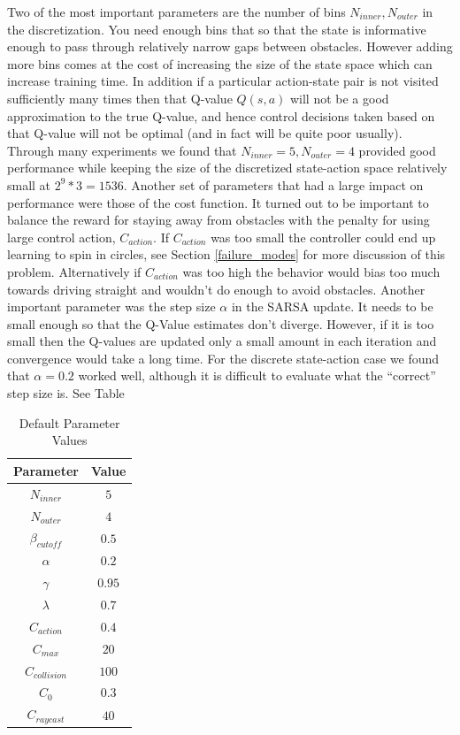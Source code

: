 \documentclass{article}
\begin{document}
Two of the most important parameters are the number of bins $N_{inner}, N_{outer}$ in the discretization. You need enough bins that so that the state is informative enough to pass through relatively narrow gaps between obstacles. However adding more bins comes at the cost of increasing the size of the state space which can increase training time. In addition if a particular action-state pair is not visited sufficiently many times then that Q-value $Q(s,a)$ will not be a good approximation to the true Q-value, and hence control decisions taken based on that Q-value will not be optimal (and in fact will be quite poor usually). Through many experiments we found that $N_{inner} = 5, N_{outer} = 4$ provided good performance while keeping the size of the discretized state-action space relatively small at $2^9 * 3 = 1536$. Another set of parameters that had a large impact on performance were those of the cost function. It turned out to be important to balance the reward for staying away from obstacles with the penalty for using large control action, $C_{action}$. If $C_{action}$ was too small the controller could end up learning to spin in circles, see Section \ref{failure_modes} for more discussion of this problem. Alternatively if $C_{action}$ was too high the behavior would bias too much towards driving straight and wouldn't do enough to avoid obstacles. Another important parameter was the step size $\alpha$ in the SARSA update. It needs to be small enough so that the Q-Value estimates don't diverge. However, if it is too small then the Q-values are updated only a small amount in each iteration and convergence would take a long time. For the discrete state-action case we found that $\alpha = 0.2$ worked well, although it is difficult to evaluate what the ``correct'' step size is. See Table

\begin{table}
\centering
\begin{tabular}{|c|c|}
\hline
Parameter & Value  \\ \hline
$N_{inner}$ & $5$ \\ \hline
$N_{outer}$ & $4$ \\ \hline
$\beta_{cutoff}$ & $0.5$ \\ \hline
$\alpha$ & $0.2$ \\ \hline
$\gamma$ & $0.95$ \\ \hline
$\lambda$ & $0.7$ \\ \hline
$C_{action}$ & $0.4$ \\ \hline
$C_{max}$ & $20$ \\ \hline
$C_{collision}$ & $100$ \\ \hline
$C_0$ & $0.3$ \\ \hline
$C_{raycast}$ & $40$ \\ \hline

\end{tabular}
\caption{Default Parameter Values}
\label{table:defaultParameters}
\end{table}
%
%
\end{document}
